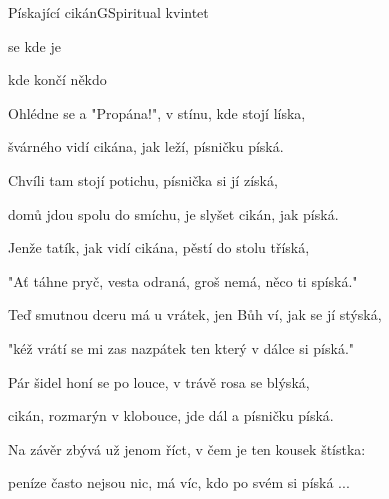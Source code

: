 \setcounter{page}{66}
\begin{song}{Pískající cikán}{G}{Spiritual kvintet}

\begin{SBVerse}

  se  kde  je 

 kde  končí   někdo 

\end{SBVerse}

\begin{SBVerse}

Ohlédne se a "Propána!", v stínu, kde stojí líska,

švárného vidí cikána, jak leží, písničku píská.

\end{SBVerse}

\begin{SBVerse}

Chvíli tam stojí potichu, písnička si jí získá,

domů jdou spolu do smíchu, je slyšet cikán, jak píská.

\end{SBVerse}

\begin{SBVerse}

Jenže tatík, jak vidí cikána, pěstí do stolu tříská,

"Ať táhne pryč, vesta odraná, groš nemá, něco ti spíská."

\end{SBVerse}

\begin{SBVerse}

Teď smutnou dceru má u vrátek, jen Bůh ví, jak se jí stýská,

"kéž vrátí se mi zas nazpátek ten který v dálce si píská."

\end{SBVerse}

\begin{SBVerse}

Pár šidel honí se po louce, v trávě rosa se blýská,

cikán, rozmarýn v klobouce, jde dál a písničku píská.

\end{SBVerse}

\begin{SBVerse}

Na závěr zbývá už jenom říct, v čem je ten kousek štístka:

peníze často nejsou nic, má víc, kdo po svém si píská ...

\end{SBVerse}

\end{song}

\pagebreak
